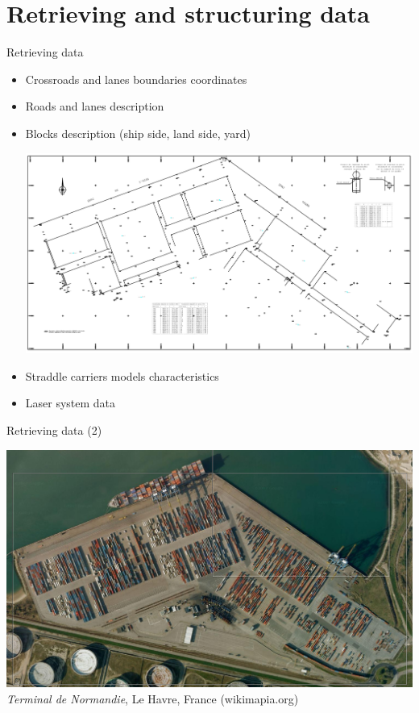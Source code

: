 \documentclass{beamer}
\begin{document}
\section{Retrieving and structuring data}
 
\begin{frame}{Retrieving data}
    \begin{itemize}
      \item Crossroads and lanes boundaries coordinates
      \pause
      \item Roads and lanes description
      \pause
      \item Blocks description (ship side, land side, yard)      
    
    \begin{center}
      \includegraphics[height=.50\textheight]{fig/planNormandieZ.png}
    \end{center}
      \pause
      \item Straddle carriers models characteristics
      \pause
      \item Laser system data
    \end{itemize}

    
\end{frame}
\begin{frame}{Retrieving data (2)}
    \begin{center}
      \includegraphics[height=.70\textheight]{fig/NormandieZ.png} \\
      \tiny \textit{Terminal de Normandie}, Le Havre, France (wikimapia.org)
    \end{center}
\end{frame}
\end{document}
